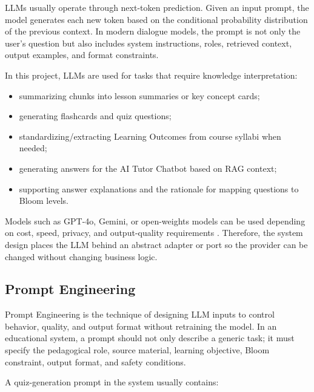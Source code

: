 LLMs usually operate through next-token prediction. Given an input
prompt, the model generates each new token based on the conditional
probability distribution of the previous context. In modern dialogue
models, the prompt is not only the user's question but also includes
system instructions, roles, retrieved context, output examples, and
format constraints.

In this project, LLMs are used for tasks that require knowledge
interpretation:

\begin{itemize}
    \item summarizing chunks into lesson summaries or key concept cards;
    \item generating flashcards and quiz questions;
    \item standardizing/extracting Learning Outcomes from course syllabi when needed;
    \item generating answers for the AI Tutor Chatbot based on RAG context;
    \item supporting answer explanations and the rationale for mapping questions to Bloom levels.
\end{itemize}

Models such as GPT-4o, Gemini, or open-weights models can be used
depending on cost, speed, privacy, and output-quality requirements
\cite{openai2024gpt4o,google2024gemini}. Therefore, the system design
places the LLM behind an abstract adapter or port so the provider can be
changed without changing business logic.

\subsection{Prompt Engineering}
\label{subsec:prompt-engineering}

Prompt Engineering is the technique of designing LLM inputs to control
behavior, quality, and output format without retraining the model. In an
educational system, a prompt should not only describe a generic task; it
must specify the pedagogical role, source material, learning objective,
Bloom constraint, output format, and safety conditions.

A quiz-generation prompt in the system usually contains:

